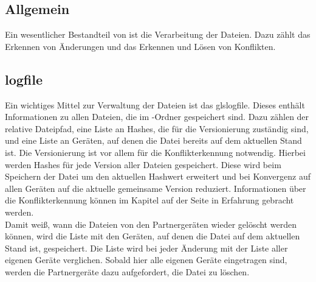 \subsection{Allgemein}
Ein wesentlicher Bestandteil von \sblit ist die Verarbeitung der Dateien. Dazu zählt das Erkennen von Änderungen und das Erkennen und Lösen von Konflikten.
\subsection{\gls{logfile}}\label{Logfile}
Ein wichtiges Mittel zur Verwaltung der Dateien ist das gls{logfile}. Dieses enthält Informationen zu allen Dateien, die im \sblit-Ordner gespeichert sind. Dazu zählen der relative Dateipfad, eine Liste an Hashes, die für die Versionierung zuständig sind, und eine Liste an Geräten, auf denen die Datei bereits auf dem aktuellen Stand ist. Die Versionierung ist vor allem für die Konflikterkennung notwendig. Hierbei werden Hashes für jede Version aller Dateien gespeichert. Diese wird beim Speichern der Datei um den aktuellen Hashwert erweitert und bei Konvergenz auf allen Geräten auf die aktuelle gemeinsame Version reduziert. Informationen über die Konflikterkennung können im Kapitel  auf der Seite \pageref{Konflikterkennung} in Erfahrung gebracht werden. \\
Damit \sblit weiß, wann die Dateien von den Partnergeräten  wieder gelöscht werden können, wird die Liste mit den Geräten, auf denen die Datei auf dem aktuellen Stand ist, gespeichert. Die Liste wird bei jeder Änderung mit der Liste aller eigenen Geräte verglichen. Sobald hier alle eigenen Geräte eingetragen sind, werden die Partnergeräte dazu aufgefordert, die Datei zu löschen. 

